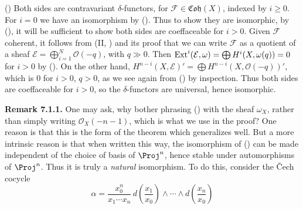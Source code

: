 {() Both sides are contravariant $\delta$-functors, for $\mathcal F\in\mathfrak{Coh}(X)$, indexed by $i\ge0$. For $i=0$ we have an isomorphism by (). Thus to show they are isomorphic, by (), it will be sufficient to show both sides are coeffaceable for $i>0$. Given $\mathcal F$ coherent, it follows from (II, ) and its proof that we can write $\mathcal F$ as a quotient of a sheaf $\mathcal E=\bigoplus_{i=1}^N\mathcal O(-q)$, with $q\gg0$. Then $\operatorname{Ext}^i(\mathcal E,\omega)=\bigoplus H^i(X,\omega(q))=0$ for $i>0$ by (). On the other hand, $H^{n-i}(X,\mathcal E)'=\bigoplus H^{n-i}(X,\mathcal O(-q))'$, which is $0$ for $i>0$, $q>0$, as we see again from () by inspection. Thus both sides are coeffaceable for $i>0$, so the $\delta$-functors are universal, hence isomorphic.

\medskip
\noindent\hypertarget{result-III-7.1.1}{}\textbf{Remark 7.1.1.} One may ask, why bother phrasing () with the sheaf $\omega_X$, rather than simply writing $\mathcal O_X(-n-1)$, which is what we use in the proof? One reason is that this is the form of the theorem which generalizes well. But a more intrinsic reason is that when written this way, the isomorphism of () can be made independent of the choice of basis of $\Proj^n$, hence stable under automorphisms of $\Proj^n$. Thus it is truly a \emph{natural} isomorphism. To do this, consider the \v Cech cocycle
\[
\alpha=\frac{x_0^n}{x_1\cdots x_n}\,d\left(\frac{x_1}{x_0}\right)\wedge\cdots\wedge d\left(\frac{x_n}{x_0}\right)
\]
}
